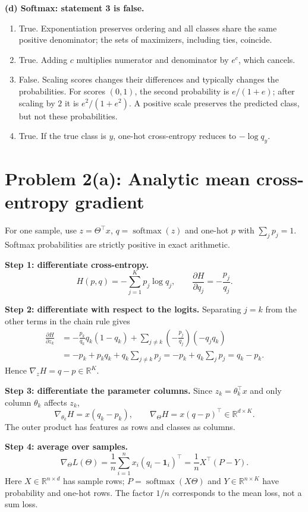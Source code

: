 \documentclass[11pt,a4paper]{article}
\newcommand{\R}{\mathbb R}
\newcommand{\Th}{\Theta}
\newcommand{\softmax}{\operatorname{softmax}}
\begin{document}
\textbf{(d) Softmax: statement 3 is false.}
\begin{enumerate}[label=\arabic*)]
\item True. Exponentiation preserves ordering and all classes share the same positive denominator; the sets of maximizers, including ties, coincide.
\item True. Adding $c$ multiplies numerator and denominator by $e^c$, which cancels.
\item False. Scaling scores changes their differences and typically changes the probabilities. For scores $(0,1)$, the second probability is $e/(1+e)$; after scaling by $2$ it is $e^2/(1+e^2)$. A positive scale preserves the predicted class, but not these probabilities.
\item True. If the true class is $y$, one-hot cross-entropy reduces to $-\log q_y$.
\end{enumerate}

\clearpage
\section*{Problem 2(a): Analytic mean cross-entropy gradient}
For one sample, use $z=\Th^\top x$, $q=\softmax(z)$ and one-hot $p$ with $\sum_jp_j=1$. Softmax probabilities are strictly positive in exact arithmetic.

\textbf{Step 1: differentiate cross-entropy.}
\[
H(p,q)=-\sum_{j=1}^K p_j\log q_j,
\qquad \boxed{\frac{\partial H}{\partial q_j}=-\frac{p_j}{q_j}.}
\]

\textbf{Step 2: differentiate with respect to the logits.} Separating $j=k$ from the other terms in the chain rule gives
\begin{align*}
\frac{\partial H}{\partial z_k}
&=-\frac{p_k}{q_k}q_k(1-q_k)
 +\sum_{j\ne k}\left(-\frac{p_j}{q_j}\right)(-q_jq_k)\\
&=-p_k+p_kq_k+q_k\sum_{j\ne k}p_j
 =-p_k+q_k\sum_jp_j=q_k-p_k.
\end{align*}
Hence $\boxed{\nabla_z H=q-p\in\R^K}$.

\textbf{Step 3: differentiate the parameter columns.} Since $z_k=\theta_k^\top x$ and only column $\theta_k$ affects $z_k$,
\[
\nabla_{\theta_k}H=x(q_k-p_k),\qquad
\boxed{\nabla_{\Th}H=x(q-p)^\top\in\R^{d\times K}.}
\]
The outer product has features as rows and classes as columns.

\textbf{Step 4: average over samples.}
\[
\boxed{\nabla_{\Th}L(\Th)=\frac1n\sum_{i=1}^n x_i(q_i-\mathbf 1_i)^\top
       =\frac1n X^\top(P-Y).}
\]
Here $X\in\R^{n\times d}$ has sample rows; $P=\softmax(X\Th)$ and $Y\in\R^{n\times K}$ have probability and one-hot rows. The factor $1/n$ corresponds to the mean loss, not a sum loss.
\end{document}
